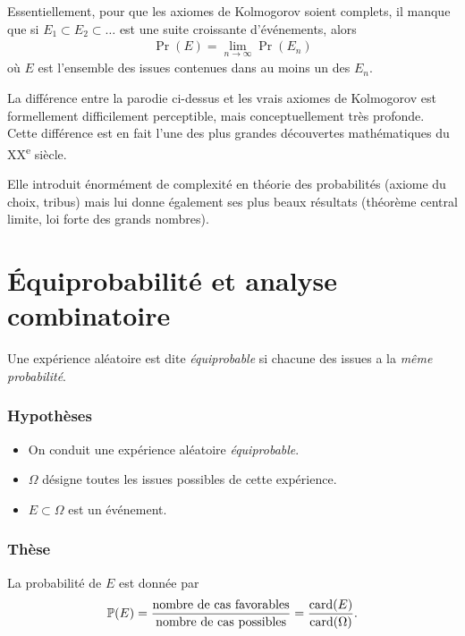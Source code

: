 \documentclass[main.tex]{subfiles}
\begin{document}
\begin{remark}

    Essentiellement, pour que les axiomes de Kolmogorov soient complets,
    il manque que si $E_1 \subset E_2 \subset \ldots$ est une suite croissante d'événements,
    alors
    \begin{align}
        \Pr(E) = \lim_{n \to \infty} \Pr(E_n)
    \end{align}
    où $E$ est l'ensemble des issues contenues dans au moins un des $E_n$.

    La différence entre la parodie ci-dessus et les vrais axiomes de Kolmogorov est formellement difficilement perceptible,
    mais conceptuellement très profonde.
    Cette différence est en fait l'une des plus grandes découvertes mathématiques du XX\textsuperscript{e} siècle.

    Elle introduit énormément de complexité en théorie des probabilités
    (axiome du choix, tribus)
    mais lui donne également ses plus beaux résultats
    (théorème central limite, loi forte des grands nombres).
\end{remark}

\section{Équiprobabilité et analyse combinatoire}

\begin{definition}
    [Équiprobabilité]

    Une expérience aléatoire est dite \emph{équiprobable}
    si chacune des issues a la \emph{même probabilité}.
\end{definition}

\begin{proposition}

    \subsubsection{Hypothèses}
    \begin{itemize}
        \item On conduit une expérience aléatoire \emph{équiprobable}.
        \item $\Omega$ désigne toutes les issues possibles de cette expérience.
        \item $E \subset \Omega$ est un événement.
    \end{itemize}

    \subsubsection{Thèse}
    La probabilité de $E$ est donnée par
    \begin{align}
        \mathbb{P}(E) = \frac {\text{nombre de cas favorables}} {\text{nombre de cas possibles}}
        = \frac {\operatorname{card}(E)} {\operatorname{card}(\Omega)}.
    \end{align}
\end{proposition}
\end{document}
